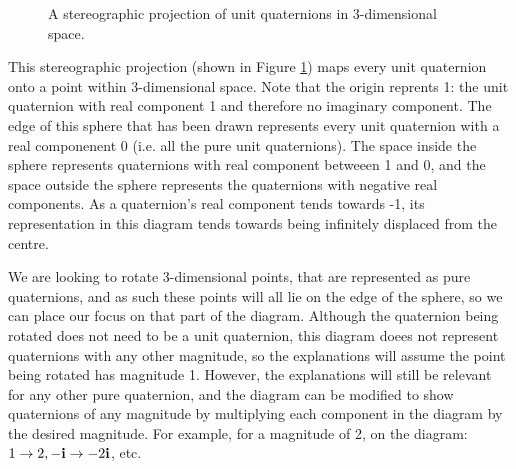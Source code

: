 \documentclass[10pt]{article}
\begin{document}
\begin{figure}[ht]
    \centering
    \caption{A stereographic projection of unit quaternions in 3-dimensional space. \cite{Penguin}}
    \label{SterographicFig}
\end{figure}

This stereographic projection (shown in Figure \ref{SterographicFig}) maps every unit quaternion onto a point within 3-dimensional space. Note that the origin reprents 1: the unit quaternion with real component 1 and therefore no imaginary component. The edge of this sphere that has been drawn represents every unit quaternion with a real componenent 0 (i.e. all the pure unit quaternions). The space inside the sphere represents quaternions with real component betweeen 1 and 0, and the space outside the sphere represents the quaternions with negative real components. As a quaternion's real component tends towards -1, its representation in this diagram tends towards being infinitely displaced from the centre.

We are looking to rotate 3-dimensional points, that are represented as pure quaternions, and as such these points will all lie on the edge of the sphere, so we can place our focus on that part of the diagram. Although the quaternion being rotated does not need to be a unit quaternion, this diagram doees not represent quaternions with any other magnitude, so the explanations will assume the point being rotated has magnitude 1. However, the explanations will still be relevant for any other pure quaternion, and the diagram can be modified to show quaternions of any magnitude by multiplying each component in the diagram by the desired magnitude. For example, for a magnitude of 2, on the diagram: $1 \rightarrow 2, -\vb{i} \rightarrow -2\vb{i}$, etc.
\end{document}
